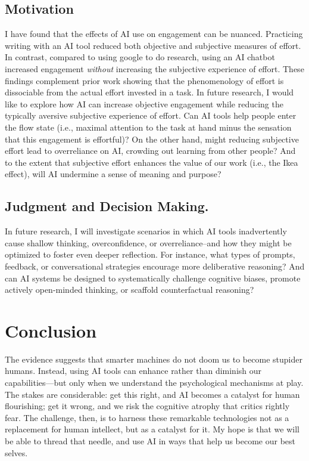 \documentclass[11pt]{report}
\begin{document}
\begin{mainf}
\subsection*{Motivation} I have found that the effects of AI use on engagement can be nuanced. Practicing writing with an AI tool reduced both objective and subjective measures of effort. In contrast, compared to using google to do research, using an AI chatbot increased engagement \textit{without} increasing the subjective experience of effort. These findings complement prior work showing that the phenomenology of effort is dissociable from the actual effort invested in a task. In future research, I would like to explore how AI can increase objective engagement while reducing the typically aversive subjective experience of effort. Can AI tools help people enter the flow state (i.e., maximal attention to the task at hand minus the sensation that this engagement is effortful)? On the other hand, might reducing subjective effort lead to overreliance on AI, crowding out learning from other people? And to the extent that subjective effort enhances the value of our work (i.e., the Ikea effect), will AI undermine a sense of meaning and purpose?

\subsection*{Judgment and Decision Making.} In future research, I will investigate scenarios in which AI tools inadvertently cause shallow thinking, overconfidence, or overreliance–and how they might be optimized to foster even deeper reflection. For instance, what types of prompts, feedback, or conversational strategies encourage more deliberative reasoning? And can AI systems be designed to systematically challenge cognitive biases, promote actively open-minded thinking, or scaffold counterfactual reasoning?

\section{Conclusion}

The evidence suggests that smarter machines do not doom us to become stupider humans. Instead, using AI tools can enhance rather than diminish our capabilities---but only when we understand the psychological mechanisms at play. The stakes are considerable: get this right, and AI becomes a catalyst for human flourishing; get it wrong, and we risk the cognitive atrophy that critics rightly fear.
The challenge, then, is to harness these remarkable technologies not as a replacement for human intellect, but as a catalyst for it. My hope is that we will be able to thread that needle, and use AI in ways that help us become our best selves.

\end{mainf}
\end{document}

